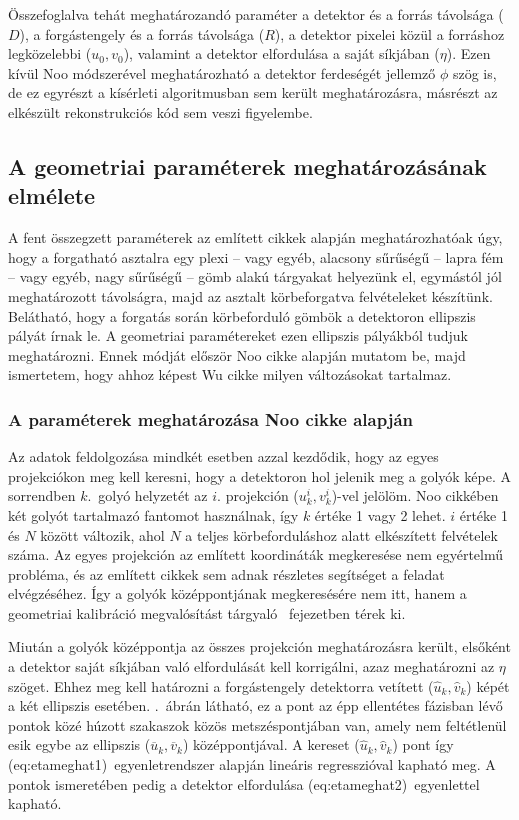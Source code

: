 \documentclass[a4paper,12pt,twoside]{article}
\begin{document}
 Összefoglalva tehát meghatározandó paraméter a detektor és a forrás távolsága ($D$), a forgástengely és a forrás távolsága ($R$), a detektor pixelei közül a forráshoz legközelebbi ($u_0,v_0$), valamint a detektor elfordulása a saját síkjában ($\eta$).  Ezen kívül Noo módszerével meghatározható a detektor ferdeségét jellemző $\phi$ szög is, de ez egyrészt a kísérleti algoritmusban sem került meghatározásra, másrészt az elkészült rekonstrukciós kód sem veszi figyelembe.
 

\subsection{A geometriai paraméterek meghatározásának elmélete}

A fent összegzett paraméterek az említett cikkek alapján meghatározhatóak úgy, hogy a forgatható asztalra egy plexi --  vagy egyéb, alacsony sűrűségű -- lapra fém -- vagy egyéb, nagy sűrűségű -- gömb alakú tárgyakat helyezünk el, egymástól jól meghatározott távolságra, majd az asztalt körbeforgatva felvételeket készítünk. Belátható\cite{noo}, hogy a forgatás során körbeforduló gömbök a detektoron ellipszis pályát írnak le. A geometriai paramétereket ezen ellipszis pályákból tudjuk meghatározni.
Ennek módját először Noo cikke alapján mutatom be, majd ismertetem, hogy ahhoz képest Wu cikke milyen változásokat tartalmaz.

\subsubsection{A paraméterek meghatározása Noo\cite{noo} cikke alapján}

Az adatok feldolgozása mindkét esetben azzal kezdődik, hogy az egyes projekciókon meg kell keresni, hogy a detektoron hol jelenik meg a golyók képe. A sorrendben $k$.\ golyó helyzetét az $i$. projekción ($u_k^i, v_k^i$)-vel jelölöm. Noo cikkében két golyót tartalmazó fantomot használnak, így $k$ értéke 1 vagy 2 lehet. $i$ értéke 1 és $N$ között változik, ahol $N$ a teljes körbeforduláshoz alatt elkészített felvételek száma.  Az egyes projekción az említett koordináták megkeresése nem egyértelmű probléma, és az említett cikkek sem adnak részletes segítséget  a feladat elvégzéséhez. Így a golyók középpontjának megkeresésére nem itt, hanem a geometriai kalibráció megvalósítást tárgyaló \ fejezetben térek ki. 

Miután a golyók középpontja az összes projekción meghatározásra került, elsőként a detektor saját síkjában való elfordulását kell korrigálni, azaz meghatározni az $\eta$ szöget. Ehhez meg kell határozni a forgástengely detektorra vetített ($\hat{u}_k, \hat{v}_k$) képét a két ellipszis esetében. .~ábrán látható, ez a pont az épp ellentétes fázisban lévő pontok közé húzott szakaszok közös metszéspontjában van, amely nem feltétlenül esik egybe az ellipszis ($\overline{u}_k , \overline{v}_k$) középpontjával. A kereset ($\hat{u}_k, \hat{v}_k$) pont így \aref({eq:etameghat1})~egyenletrendszer alapján lineáris regresszióval kapható meg. A pontok ismeretében pedig a detektor elfordulása \aref({eq:etameghat2})~egyenlettel kapható.
\end{document}
